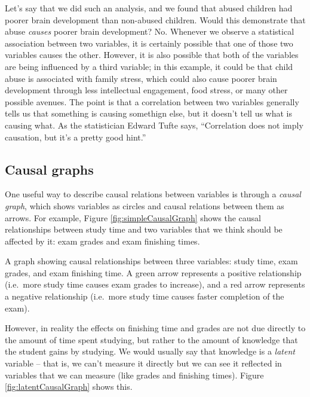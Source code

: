 \documentclass[]{book}
\theoremstyle{definition}
\theoremstyle{definition}
\theoremstyle{definition}
\theoremstyle{remark}
\begin{document}
Let's say that we did such an analysis, and we found that abused
children had poorer brain development than non-abused children. Would
this demonstrate that abuse \emph{causes} poorer brain development? No.
Whenever we observe a statistical association between two variables, it
is certainly possible that one of those two variables causes the other.
However, it is also possible that both of the variables are being
influenced by a third variable; in this example, it could be that child
abuse is associated with family stress, which could also cause poorer
brain development through less intellectual engagement, food stress, or
many other possible avenues. The point is that a correlation between two
variables generally tells us that something is causing somethign else,
but it doesn't tell us what is causing what. As the statistician Edward
Tufte says, ``Correlation does not imply causation, but it's a pretty
good hint.''

\subsection{Causal graphs}\label{causal-graphs}

One useful way to describe causal relations between variables is through
a \emph{causal graph}, which shows variables as circles and causal
relations between them as arrows. For example, Figure
\ref{fig:simpleCausalGraph} shows the causal relationships between study
time and two variables that we think should be affected by it: exam
grades and exam finishing times.

\hypertarget{htmlwidget-5672838f2bcaf0ca47f5}{}

\label{fig:simpleCausalGraph}A graph showing causal relationships between
three variables: study time, exam grades, and exam finishing time. A
green arrow represents a positive relationship (i.e.~more study time
causes exam grades to increase), and a red arrow represents a negative
relationship (i.e.~more study time causes faster completion of the
exam).

However, in reality the effects on finishing time and grades are not due
directly to the amount of time spent studying, but rather to the amount
of knowledge that the student gains by studying. We would usually say
that knowledge is a \emph{latent} variable -- that is, we can't measure
it directly but we can see it reflected in variables that we can measure
(like grades and finishing times). Figure \ref{fig:latentCausalGraph}
shows this.

\hypertarget{htmlwidget-45c4a6fd972256d04367}{}
\end{document}
